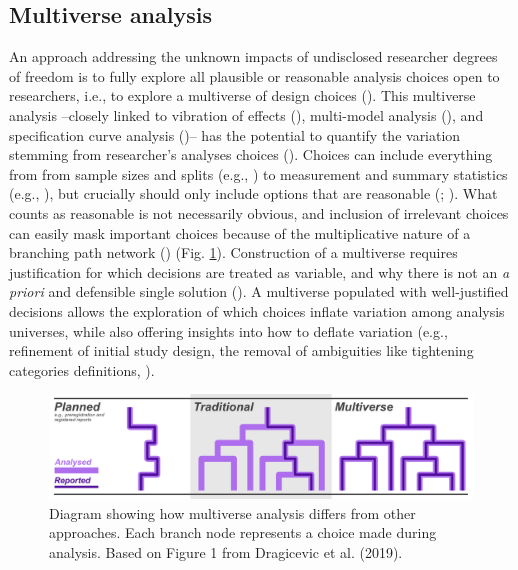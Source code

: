 \documentclass[10pt,a4paper]{article}
\begin{document}
\subsection{Multiverse analysis}\label{multiverse-analysis}

An approach addressing the unknown impacts of undisclosed researcher degrees of freedom is to fully explore all plausible or reasonable analysis choices open to researchers, i.e., to explore a multiverse of design choices ().
This multiverse analysis --closely linked to vibration of effects (), multi-model analysis (), and specification curve analysis ()-- has the potential to quantify the variation stemming from researcher's analyses choices ().
Choices can include everything from from sample sizes and splits (e.g., ) to measurement and summary statistics (e.g., ), but crucially should only include options that are reasonable (; ).
What counts as reasonable is not necessarily obvious, and inclusion of irrelevant choices can easily mask important choices because of the multiplicative nature of a branching path network () (Fig. \ref{fig:multiDiagram}).
Construction of a multiverse requires justification for which decisions are treated as variable, and why there is not an \emph{a priori} and defensible single solution ().
A multiverse populated with well-justified decisions allows the exploration of which choices inflate variation among analysis universes, while also offering insights into how to deflate variation (e.g., refinement of initial study design, the removal of ambiguities like tightening categories definitions, ).

\begin{figure}
\includegraphics[width=1\linewidth]{../ext_images/Multiverse compared diagram updated} \caption{Diagram showing how multiverse analysis differs from other approaches. Each branch node represents a choice made during analysis. Based on Figure 1 from Dragicevic et al. (2019).}\label{fig:multiDiagram}
\end{figure}
\end{document}
